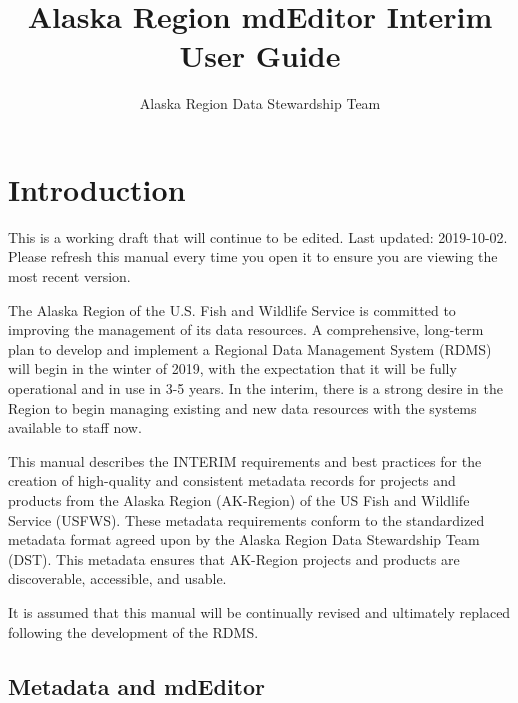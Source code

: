 \documentclass[
]{book}
\title{Alaska Region mdEditor Interim User Guide}
\author{Alaska Region Data Stewardship Team}
\date{}
\makeatletter
\newenvironment{kframe}{%
\medskip{}
\setlength{\fboxsep}{.8em}
 \def\at@end@of@kframe{}%
 \ifinner\ifhmode%
  \def\at@end@of@kframe{\end{minipage}}%
  \begin{minipage}{\columnwidth}%
 \fi\fi%
 \def\FrameCommand##1{\hskip\@totalleftmargin \hskip-\fboxsep
 \colorbox{shadecolor}{##1}\hskip-\fboxsep
     \hskip-\linewidth \hskip-\@totalleftmargin \hskip\columnwidth}%
 \MakeFramed {\advance\hsize-\width
   \@totalleftmargin\z@ \linewidth\hsize
   \@setminipage}}%
 {\par\unskip\endMakeFramed%
 \at@end@of@kframe}
\newenvironment{rmdblock}[1]
  {
  \begin{itemize}
  \renewcommand{\labelitemi}{
    \raisebox{-.7\height}[0pt][0pt]{
      {\setkeys{Gin}{width=3em,keepaspectratio}\texttt{[image: images/\#1]}}
    }
  }
  \setlength{\fboxsep}{1em}
  \begin{kframe}
  \item
  }
  {
  \end{kframe}
  \end{itemize}
  }
\newenvironment{rmdcaution}
  {\begin{rmdblock}{caution}}
  {\end{rmdblock}}
\makeatother
\begin{document}
\maketitle


\thispagestyle{empty}

\setlength{\abovedisplayskip}{-5pt}
\setlength{\abovedisplayshortskip}{-5pt}

{
\setcounter{tocdepth}{1}
\tableofcontents
}
\hypertarget{intro}{%
\chapter{Introduction}\label{intro}}

\begin{rmdcaution}
This is a working draft that will continue to be edited. Last updated:
2019-10-02. Please refresh this manual every time you open it to ensure
you are viewing the most recent version.
\end{rmdcaution}

The Alaska Region of the U.S. Fish and Wildlife Service is committed to improving the management of its data resources. A comprehensive, long-term plan to develop and implement a Regional Data Management System (RDMS) will begin in the winter of 2019, with the expectation that it will be fully operational and in use in 3-5 years. In the interim, there is a strong desire in the Region to begin managing existing and new data resources with the systems available to staff now.

This manual describes the INTERIM requirements and best practices for the creation of high-quality and consistent metadata records for projects and products from the Alaska Region (AK-Region) of the US Fish and Wildlife Service (USFWS). These metadata requirements conform to the standardized metadata format agreed upon by the Alaska Region Data Stewardship Team (DST). This metadata ensures that AK-Region projects and products are discoverable, accessible, and usable.

It is assumed that this manual will be continually revised and ultimately replaced following the development of the RDMS.

\hypertarget{metadata-and-mdeditor}{%
\section{Metadata and mdEditor}\label{metadata-and-mdeditor}}
\end{document}
